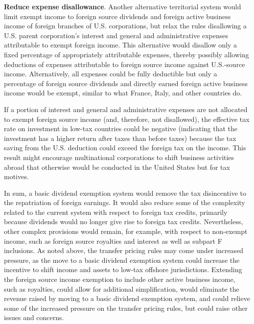 \begin{select}
\textbf{Reduce expense disallowance}.  Another alternative territorial system would limit exempt 
income to foreign source dividends and foreign active business income of foreign 
branches of U.S. corporations, but relax the rules disallowing a U.S. parent corporation's 
interest and general and administrative expenses attributable to exempt foreign income.  
This alternative would disallow only a fixed percentage of appropriately attributable 
expenses, thereby possibly allowing deductions of expenses attributable to foreign source 
income against U.S.-source income.  Alternatively, all expenses could be fully deductible 
but only a percentage of foreign source dividends and directly earned foreign active 
business income would be exempt, similar to what France, Italy, and other countries do.
 
If a portion of interest and general and administrative expenses are not allocated 
to exempt foreign source income (and, therefore, not disallowed), the effective tax rate on 
investment in low-tax countries could be negative (indicating that the investment has a 
higher return after taxes than before taxes) because the tax saving from the U.S. 
deduction could exceed the foreign tax on the income.  This result might encourage 
multinational corporations to shift business activities abroad that otherwise would be 
conducted in the United States but for tax motives. 
   
In sum, a basic dividend exemption system would remove the tax disincentive to 
the repatriation of foreign earnings.  It would also reduce some of the complexity related 
to the current system with respect to foreign tax credits, primarily because dividends 
would no longer give rise to foreign tax credits.  Nevertheless, other complex provisions 
would remain, for example, with respect to non-exempt income, such as foreign source 
royalties and interest as well as subpart F inclusions.  As noted above, the transfer pricing 
rules may come under increased pressure, as the move to a basic dividend exemption 
system could increase the incentive to shift income and assets to low-tax offshore 
jurisdictions.  Extending the foreign source income exemption to include other active 
business income, such as royalties, could allow for additional simplification, would 
eliminate the revenue raised by moving to a basic dividend exemption system, and could 
relieve some of the increased pressure on the transfer pricing rules, but could raise other 
issues and concerns. 

\end{select}

